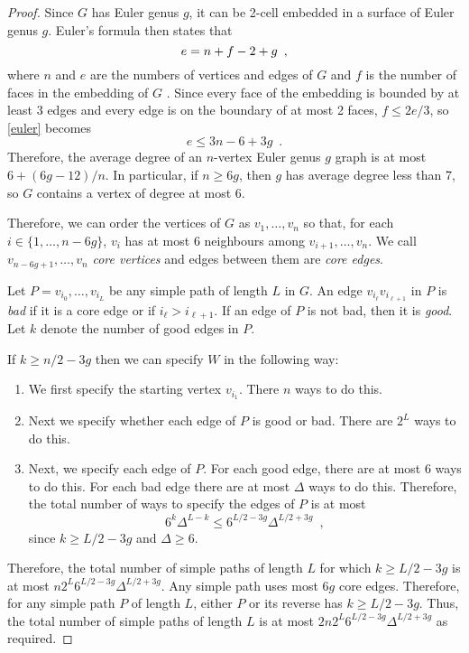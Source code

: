 \documentclass[lotsofwhite]{patmorin}
\begin{document}
\begin{proof}
   Since $G$ has Euler genus $g$, it can be 2-cell embedded in a surface
   of Euler genus $g$.  Euler's formula then states that 
   \begin{equation}
      e = n+f-2+g \enspace ,  \eqlabel{euler}
   \end{equation}
   where $n$ and $e$ are the numbers of vertices and edges of
   $G$ and $f$ is the number of faces in the embedding of $G$
   \cite{mohar.thomassen:graphs}.  Since every face of the embedding is
   bounded by at least 3 edges and every edge is on the boundary of at
   most 2 faces, $f \le 2e/3$, so \eqref{euler} becomes
   \[
       e\le 3n-6+3g \enspace .
   \]
   Therefore, the average degree of an $n$-vertex Euler genus $g$ graph
   is at most $6+(6g-12)/n$.  In particular, if $n \ge 6g$, then $g$
   has average degree less than 7, so $G$ contains a vertex of degree
   at most $6$.
   
   Therefore, we can order the vertices of $G$ as $v_1,\ldots,v_n$ so that,
   for each $i\in\{1,\ldots,n-6g\}$, $v_i$ has at most 6 neighbours among
   $v_{i+1},\ldots,v_n$.  We call $v_{n-6g+1},\ldots,v_n$ \emph{core vertices}
   and edges between them are \emph{core edges}.

   Let $P=v_{i_0},\ldots,v_{i_L}$ be any simple path of length $L$ in $G$.
   An edge $v_{i_\ell}v_{i_{\ell+1}}$ in $P$ is \emph{bad} if it is a core
   edge or if $i_{\ell}>i_{\ell+1}$. If an edge of $P$ is not bad, then
   it is \emph{good}.  Let $k$ denote the number of good edges in $P$.

   If $k\ge n/2-3g$ then we can specify $W$ in the following way:
   \begin{enumerate}
     \item We first specify the starting vertex $v_{i_1}$.  There $n$
       ways to do this.
     \item Next we specify whether each edge of $P$ is good or bad.
       There are $2^L$ ways to do this.
     \item Next, we specify each edge of $P$.  For each good edge,
       there are at most 6 ways to do this. For each bad edge there are 
       at most $\Delta$ ways to do this.
      Therefore, the total number of ways to specify the edges of $P$ is at most
      \[   6^k\Delta^{L-k} \le 6^{L/2-3g}\Delta^{L/2+3g}  \enspace ,\]
      since $k\ge L/2-3g$ and $\Delta\ge 6$.
   \end{enumerate}
   Therefore, the total number of simple paths of length $L$ for which
   $k\ge L/2-3g$ is at most $n2^L6^{L/2-3g}\Delta^{L/2+3g}$.  Any simple
   path uses most $6g$ core edges.  Therefore, for any simple path
   $P$ of length $L$, either $P$ or its reverse has $k\ge L/2-3g$.
   Thus, the total number of simple paths of length $L$ is at most
   $2n2^L6^{L/2-3g}\Delta^{L/2+3g}$ as required.
\end{proof}
\end{document}
